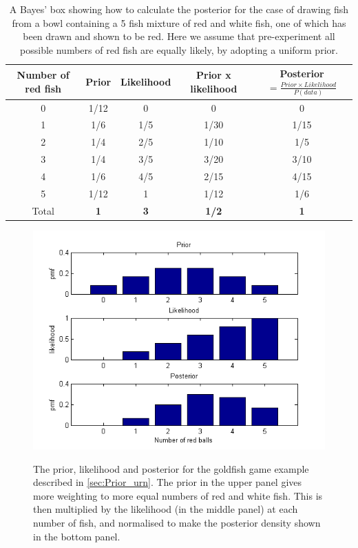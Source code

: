 \documentclass[11pt,fullpage]{book}
\begin{document}
\begin{table}[htbp]
  \centering
  \caption{A Bayes' box showing how to calculate the posterior for the case of drawing fish from a bowl containing a 5 fish mixture of red and white fish, one of which has been drawn and shown to be red. Here we assume that pre-experiment all possible numbers of red fish are equally likely, by adopting a uniform prior.}\label{tab:Prior_bayesBoxUrnUpdated}%
    \begin{tabular}{ccccc}
    \toprule
    \textbf{Number of red fish} & \textbf{Prior} & \textbf{Likelihood} & \textbf{Prior x likelihood} & \textbf{Posterior$=\frac{Prior\times Likelihood}{P(data)}$} \\
    \midrule
    0     &   1/12 & 0     & 0       & 0       \\
    1     &   1/6  &  1/5  &   1/30 &   1/15 \\
    2     &   1/4  &  2/5  &   1/10 &   1/5  \\
    3     &   1/4  &  3/5  &   3/20 &   3/10 \\
    4     &   1/6  &  4/5  &   2/15 &   4/15 \\
    5     &   1/12 & 1     &   1/12 &   1/6  \\
    \bottomrule
    Total & \textbf{1      } & \textbf{3    } & \textbf{  1/2 } & \textbf{1      } \\
    \bottomrule
    \end{tabular}%
  
\end{table}%

\begin{figure}
\centering
\scalebox{0.75} 
{\includegraphics{Prior_bayesUrnUpdated.png}}\caption{The prior, likelihood and posterior for the goldfish game example described in \ref{sec:Prior_urn}. The prior in the upper panel gives more weighting to more equal numbers of red and white fish. This is then multiplied by the likelihood (in the middle panel) at each number of fish, and normalised to make the posterior density shown in the bottom panel.}\label{fig:Prior_bayesUrnUpdated}
\end{figure}
\end{document}

